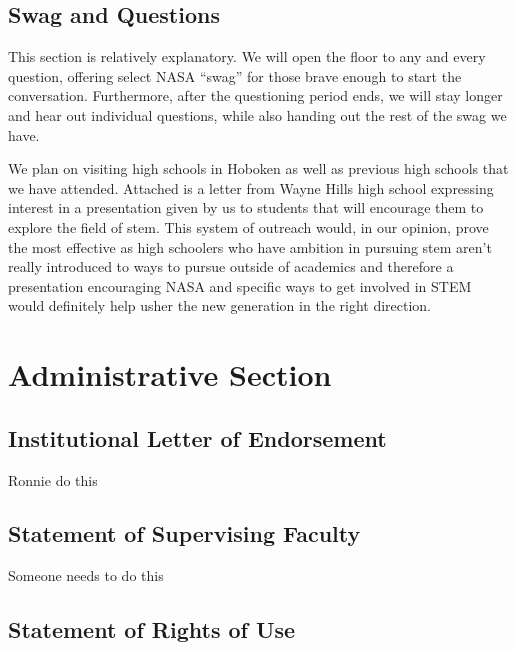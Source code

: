 \documentclass{article}
\let\Oldsection\section
\renewcommand{\section}{\FloatBarrier\Oldsection}
\let\Oldsubsection\subsection
\renewcommand{\subsection}{\FloatBarrier\Oldsubsection}
\begin{document}
\subsection{Swag and Questions}

This section is relatively explanatory. We will open the floor to any and every question, offering select NASA “swag” for those brave enough to start the conversation. Furthermore, after the questioning period ends, we will stay longer and hear out individual questions, while also handing out the rest of the swag we have. 

We plan on visiting high schools in Hoboken as well as previous high schools that we have attended. Attached is a letter from Wayne Hills high school expressing interest in a presentation given by us to students that will encourage them to explore the field of stem. This system of outreach would, in our opinion, prove the most effective as high schoolers who have ambition in pursuing stem aren’t really introduced to ways to pursue outside of academics and therefore a presentation encouraging NASA and specific ways to get involved in STEM would definitely help usher the new generation in the right direction.

\section{Administrative Section}

\subsection{Institutional Letter of Endorsement}

Ronnie do this

\subsection{Statement of Supervising Faculty}

Someone needs to do this

\subsection{Statement of Rights of Use}
\end{document}
